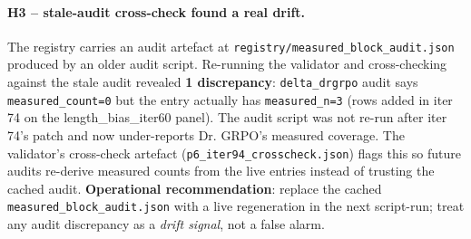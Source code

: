 \documentclass{article}
\begin{document}
\paragraph{H3 -- stale-audit cross-check found a real drift.}
The registry carries an audit artefact at
\texttt{registry/measured\_block\_audit.json} produced by an older audit
script. Re-running the validator and cross-checking against the stale audit
revealed \textbf{1 discrepancy}: \texttt{delta\_drgrpo} audit says
\texttt{measured\_count=0} but the entry actually has \texttt{measured\_n=3}
(rows added in iter 74 on the length\_bias\_iter60 panel). The audit script
was not re-run after iter 74's patch and now under-reports Dr. GRPO's
measured coverage. The validator's cross-check artefact
(\texttt{p6\_iter94\_crosscheck.json}) flags this so future audits re-derive
measured counts from the live entries instead of trusting the cached audit.
\textbf{Operational recommendation}: replace the cached
\texttt{measured\_block\_audit.json} with a live regeneration in the next
script-run; treat any audit discrepancy as a \emph{drift signal}, not a
false alarm.
\end{document}
